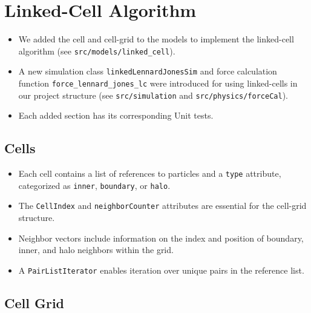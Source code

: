 \documentclass{article}
\begin{document}
\section{Linked-Cell Algorithm}
\label{sec:lc}

\begin{itemize}
    \item We added the cell and cell-grid to the models to implement the linked-cell algorithm (see \texttt{src/models/linked\_cell}).
    \item A new simulation class \texttt{linkedLennardJonesSim} and force calculation function \texttt{force\_lennard\_jones\_lc} were introduced for using linked-cells in our project structure (see \texttt{src/simulation} and \texttt{src/physics/forceCal}).
    \item Each added section has its corresponding Unit tests.
\end{itemize}

\subsection{Cells}
\label{subsec:cell}

\begin{itemize}
    \item Each cell contains a list of references to particles and a \texttt{type} attribute, categorized as \texttt{inner}, \texttt{boundary}, or \texttt{halo}.
    \item The \texttt{CellIndex} and \texttt{neighborCounter} attributes are essential for the cell-grid structure.
    \item Neighbor vectors include information on the index and position of boundary, inner, and halo neighbors within the grid.
    \item A \texttt{PairListIterator} enables iteration over unique pairs in the reference list.
\end{itemize}

\subsection{Cell Grid}
\label{subsec:grid}
\end{document}
